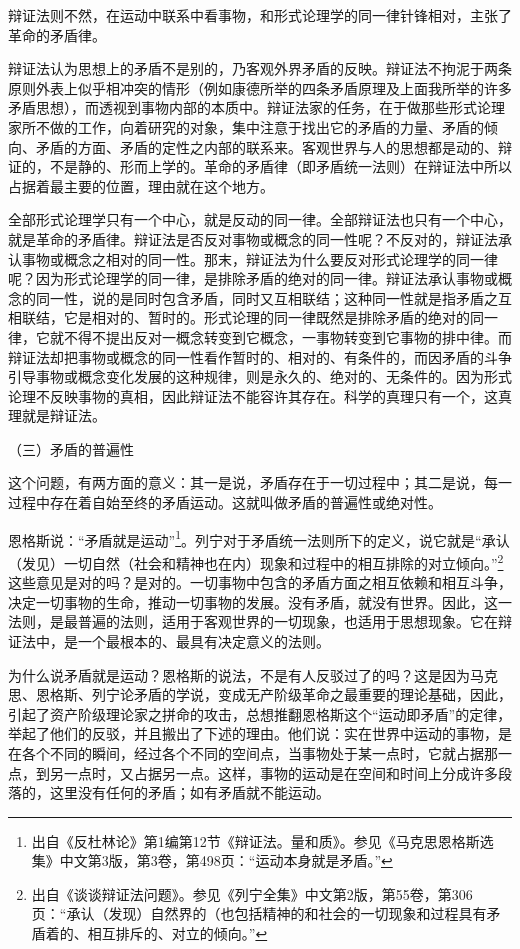 \documentclass[UTF8, 12pt, a4paper]{ctexrep}
\begin{document}
辩证法则不然，在运动中联系中看事物，和形式论理学的同一律针锋相对，主张了革命的矛盾律。

辩证法认为思想上的矛盾不是别的，乃客观外界矛盾的反映。辩证法不拘泥于两条原则外表上似乎相冲突的情形（例如康德所举的四条矛盾原理及上面我所举的许多矛盾思想），而透视到事物内部的本质中。辩证法家的任务，在于做那些形式论理家所不做的工作，向着研究的对象，集中注意于找出它的矛盾的力量、矛盾的倾向、矛盾的方面、矛盾的定性之内部的联系来。客观世界与人的思想都是动的、辩证的，不是静的、形而上学的。革命的矛盾律（即矛盾统一法则）在辩证法中所以占据着最主要的位置，理由就在这个地方。

全部形式论理学只有一个中心，就是反动的同一律。全部辩证法也只有一个中心，就是革命的矛盾律。辩证法是否反对事物或概念的同一性呢？不反对的，辩证法承认事物或概念之相对的同一性。那末，辩证法为什么要反对形式论理学的同一律呢？因为形式论理学的同一律，是排除矛盾的绝对的同一律。辩证法承认事物或概念的同一性，说的是同时包含矛盾，同时又互相联结；这种同一性就是指矛盾之互相联结，它是相对的、暂时的。形式论理的同一律既然是排除矛盾的绝对的同一律，它就不得不提出反对一概念转变到它概念，一事物转变到它事物的排中律。而辩证法却把事物或概念的同一性看作暂时的、相对的、有条件的，而因矛盾的斗争引导事物或概念变化发展的这种规律，则是永久的、绝对的、无条件的。因为形式论理不反映事物的真相，因此辩证法不能容许其存在。科学的真理只有一个，这真理就是辩证法。

（三）矛盾的普遍性

这个问题，有两方面的意义：其一是说，矛盾存在于一切过程中；其二是说，每一过程中存在着自始至终的矛盾运动。这就叫做矛盾的普遍性或绝对性。

恩格斯说：“矛盾就是运动”\footnote{出自《反杜林论》第1编第12节《辩证法。量和质》。参见《马克思恩格斯选集》中文第3版，第3卷，第498页：“运动本身就是矛盾。”}。列宁对于矛盾统一法则所下的定义，说它就是“承认（发见）一切自然（社会和精神也在内）现象和过程中的相互排除的对立倾向。”\footnote{出自《谈谈辩证法问题》。参见《列宁全集》中文第2版，第55卷，第306页：“承认（发现）自然界的（也包括精神的和社会的一切现象和过程具有矛盾着的、相互排斥的、对立的倾向。”}这些意见是对的吗？是对的。一切事物中包含的矛盾方面之相互依赖和相互斗争，决定一切事物的生命，推动一切事物的发展。没有矛盾，就没有世界。因此，这一法则，是最普遍的法则，适用于客观世界的一切现象，也适用于思想现象。它在辩证法中，是一个最根本的、最具有决定意义的法则。

为什么说矛盾就是运动？恩格斯的说法，不是有人反驳过了的吗？这是因为马克思、恩格斯、列宁论矛盾的学说，变成无产阶级革命之最重要的理论基础，因此，引起了资产阶级理论家之拼命的攻击，总想推翻恩格斯这个“运动即矛盾”的定律，举起了他们的反驳，并且搬出了下述的理由。他们说：实在世界中运动的事物，是在各个不同的瞬间，经过各个不同的空间点，当事物处于某一点时，它就占据那一点，到另一点时，又占据另一点。这样，事物的运动是在空间和时间上分成许多段落的，这里没有任何的矛盾；如有矛盾就不能运动。
\end{document}
